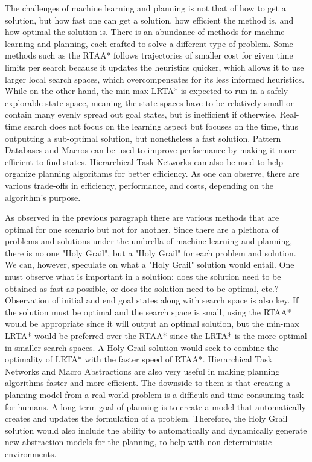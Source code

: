 \documentclass[tog]{acmsiggraph}
\begin{document}
The challenges of machine learning and planning is not that of how to
get a solution, but how fast one can get a solution, how efficient the
method is, and how optimal the solution is. There is an abundance of
methods for machine learning and planning, each crafted to solve a
different type of problem. Some methods such as the RTAA* follows
trajectories of smaller cost for given time limits per search because
it updates the heuristics quicker, which allows it to use larger local
search spaces, which overcompensates for its less informed heuristics. \cite{koenig2006real}
While on the other hand, the min-max LRTA* is expected to run in a
safely explorable state space, meaning the state spaces have to be
relatively small or contain many evenly spread out goal states, but is
inefficient if otherwise. \cite{koenig1995real} Real-time search does not focus on the
learning aspect but focuses on the time, thus outputting a sub-optimal
solution, but nonetheless a fast solution. Pattern Databases and
Macros can be used to improve performance by making it more efficient
to find states. Hierarchical Task Networks can also be used to help
organize planning algorithms for better efficiency. As one can
observe, there are various trade-offs in efficiency, performance, and
costs, depending on the algorithm's purpose.

As observed in the previous paragraph there are various methods that
are optimal for one scenario but not for another. Since there are a
plethora of problems and solutions under the umbrella of machine
learning and planning, there is no one "Holy Grail", but a "Holy
Grail" for each problem and solution. We can, however, speculate on
what a "Holy Grail" solution would entail. One must observe what is
important in a solution: does the solution need to be obtained as fast
as possible, or does the solution need to be optimal, etc.?
Observation of initial and end goal states along with search space is
also key. If the solution must be optimal and the search space is
small, using the RTAA* would be appropriate since it will output an
optimal solution, but the min-max LRTA* would be preferred over the
RTAA* since the LRTA* is the more optimal in smaller search spaces. \cite{korf1990real} A
Holy Grail solution would seek to combine the optimality of LRTA* with
the faster speed of RTAA*. Hierarchical Task Networks and Macro
Abstractions are also very useful in making planning algorithms faster
and more efficient. The downside to them is that creating a planning
model from a real-world problem is a difficult and time consuming task
for humans. A long term goal of planning is to create a model that
automatically creates and updates the formulation of a problem. \cite{botea2005macro}
Therefore, the Holy Grail solution would also include the ability to
automatically and dynamically generate new abstraction models for the
planning, to help with non-deterministic environments.
\end{document}
